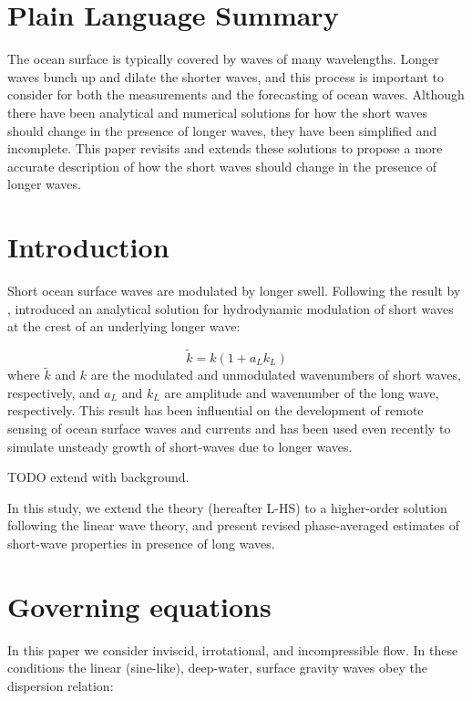 \documentclass[draft]{agujournal2019}
\begin{document}
\section*{Plain Language Summary}
The ocean surface is typically covered by waves of many wavelengths.
Longer waves bunch up and dilate the shorter waves, and this process is
important to consider for both the measurements and the forecasting of ocean
waves.
Although there have been analytical and numerical solutions for how the short
waves should change in the presence of longer waves, they have been simplified
and incomplete.
This paper revisits and extends these solutions to propose a more accurate
description of how the short waves should change in the presence of longer
waves.

\section{Introduction}

Short ocean surface waves are modulated by longer swell.
Following the result by ,
 introduced an analytical solution for hydrodynamic
modulation of short waves at the crest of an underlying longer wave:

\begin{equation}
\label{eq:tau}
\widetilde{k} = k (1 + a_L k_L)
\end{equation}
where $\widetilde{k}$ and $k$ are the modulated and unmodulated wavenumbers of
short waves, respectively, and $a_L$ and $k_L$ are amplitude and wavenumber
of the long wave, respectively.
This result has been influential on the development of remote sensing of ocean
surface waves and currents \cite{keller1975microwave,hara1994hydrodynamic}
and has been used even recently \cite{peureux2021unsteady} to simulate
unsteady growth of short-waves due to longer waves.

TODO extend with background.

In this study, we extend the  theory (hereafter L-HS)
to a higher-order solution following the linear wave theory, and present revised
phase-averaged estimates of short-wave properties in presence of long waves. 

\section{Governing equations}

In this paper we consider inviscid, irrotational, and incompressible flow.
In these conditions the linear (sine-like), deep-water, surface gravity waves
obey the dispersion relation:
\end{document}

